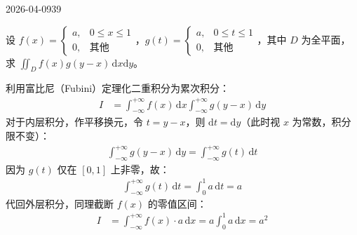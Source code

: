 \begin{mistake}{2026-04-09}{39}

\begin{problemcontent}
设 \( f(x) = \begin{cases} a, & 0 \leqslant x \leqslant 1 \\ 0, & \text{其他} \end{cases} \)，\( g(t) = \begin{cases} a, & 0 \leqslant t \leqslant 1 \\ 0, & \text{其他} \end{cases} \)，其中 \( D \) 为全平面，求 \( \iint_D f(x)g(y-x)\,\mathrm{d}x\mathrm{d}y \)。
\end{problemcontent}

\begin{solutioncontent}
利用富比尼（Fubini）定理化二重积分为累次积分：
\[
\begin{aligned}
I &= \int_{-\infty}^{+\infty} f(x) \,\mathrm{d}x \int_{-\infty}^{+\infty} g(y-x) \,\mathrm{d}y
\end{aligned}
\]
对于内层积分，作平移换元，令 \( t = y - x \)，则 \( \mathrm{d}t = \mathrm{d}y \)（此时视 \( x \) 为常数，积分限不变）：
\[
\begin{aligned}
\int_{-\infty}^{+\infty} g(y-x) \,\mathrm{d}y = \int_{-\infty}^{+\infty} g(t) \,\mathrm{d}t
\end{aligned}
\]
因为 \( g(t) \) 仅在 \( [0,1] \) 上非零，故：
\[
\begin{aligned}
\int_{-\infty}^{+\infty} g(t) \,\mathrm{d}t = \int_0^1 a \,\mathrm{d}t = a
\end{aligned}
\]
代回外层积分，同理截断 \( f(x) \) 的零值区间：
\[
\begin{aligned}
I &= \int_{-\infty}^{+\infty} f(x) \cdot a \,\mathrm{d}x = a \int_0^1 a \,\mathrm{d}x = a^2
\end{aligned}
\]
\end{solutioncontent}


\end{mistake}
